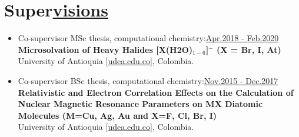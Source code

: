 \section{Super\href{.}{visions}}

\begin{itemize}
    \small

    \item Co-supervisor MSc thesis, computational chemistry:\hfill \href{.}{Apr.2018 - Feb.2020}\\
          \textbf{Microsolvation of Heavy Halides [X(H2O)$_{1-6}$]$^-$ (X = Br, I, At)}\\
          University of Antioquia [\href{www.udea.edu.co}{udea.edu.co}],
          Colombia.


    \item Co-supervisor BSc thesis, computational chemistry:\hfill \href{.}{Nov.2015 - Dec.2017}\\
          \textbf{Relativistic and Electron Correlation Effects on the Calculation of Nuclear Magnetic Resonance Parameters on MX Diatomic Molecules (M=Cu, Ag, Au and X=F, Cl, Br, I)}\\
          University of Antioquia [\href{www.udea.edu.co}{udea.edu.co}],
          Colombia.

\end{itemize}


